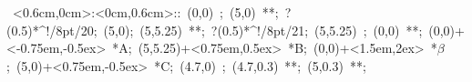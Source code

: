 \hbox{
\xy    <0.6cm,0cm>:<0cm,0.6cm>::
       (0,0) ; (5,0) **\dir{-}; ?(0.5)*^!/8pt/{20};
       (5,0); (5,5.25) **\dir{-}; ?(0.5)*^!/8pt/{21}; 
       (5,5.25) ; (0,0) **\dir{-};  
       (0,0)+<-0.75em,-0.5ex> *{A};
       (5,5.25)+<0.75em,0.5ex> *{B};
       (0,0)+<1.5em,2ex> *\hbox{$\beta$};
       (5,0)+<0.75em,-0.5ex> *{C};
	(4.7,0) ; (4.7,0.3) **\dir{-}; (5,0.3) **\dir{-};
       \endxy}
	   
